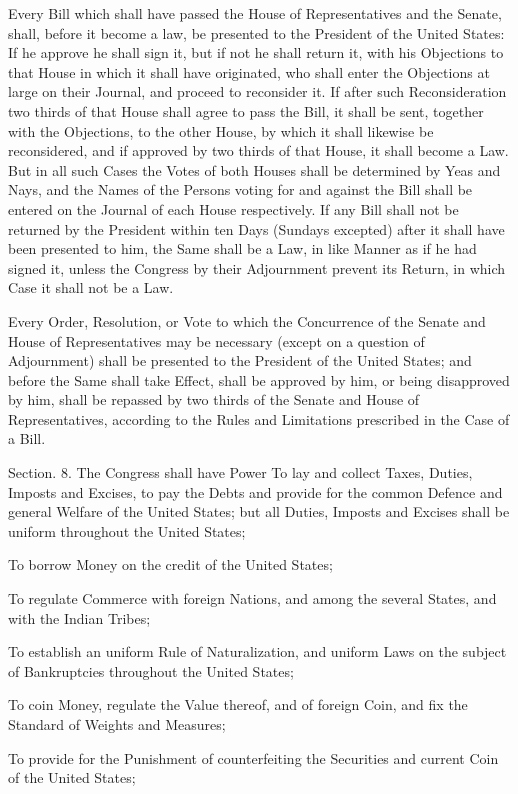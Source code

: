 \documentclass{article}
\begin{document}
Every Bill which shall have passed the House of Representatives and the Senate,
shall, before it become a law, be presented to the President of the United
States: If he approve he shall sign it, but if not he shall return it, with his
Objections to that House in which it shall have originated, who shall enter the
Objections at large on their Journal, and proceed to reconsider it. If after
such Reconsideration two thirds of that House shall agree to pass the Bill, it
shall be sent, together with the Objections, to the other House, by which it
shall likewise be reconsidered, and if approved by two thirds of that House, it
shall become a Law. But in all such Cases the Votes of both Houses shall be
determined by Yeas and Nays, and the Names of the Persons voting for and against
the Bill shall be entered on the Journal of each House respectively. If any Bill
shall not be returned by the President within ten Days (Sundays excepted) after
it shall have been presented to him, the Same shall be a Law, in like Manner as
if he had signed it, unless the Congress by their Adjournment prevent its
Return, in which Case it shall not be a Law.

Every Order, Resolution, or Vote to which the Concurrence of the Senate and
House of Representatives may be necessary (except on a question of Adjournment)
shall be presented to the President of the United States; and before the Same
shall take Effect, shall be approved by him, or being disapproved by him, shall
be repassed by two thirds of the Senate and House of Representatives, according
to the Rules and Limitations prescribed in the Case of a Bill.


Section. 8.  The Congress shall have Power To lay and collect Taxes, Duties,
Imposts and Excises, to pay the Debts and provide for the common Defence and
general Welfare of the United States; but all Duties, Imposts and Excises shall
be uniform throughout the United States;

To borrow Money on the credit of the United States;

To regulate Commerce with foreign Nations, and among the several States, and
with the Indian Tribes;

To establish an uniform Rule of Naturalization, and uniform Laws on the subject
of Bankruptcies throughout the United States;

To coin Money, regulate the Value thereof, and of foreign Coin, and fix the
Standard of Weights and Measures;

To provide for the Punishment of counterfeiting the Securities and current Coin
of the United States;
\end{document}
